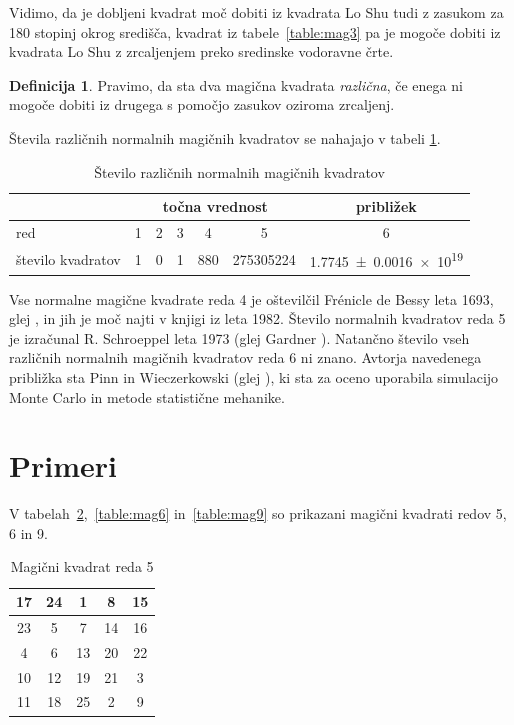 \documentclass[a4paper,12pt]{article}
\newcommand{\pojem}[1]{\emph{#1\color{purple}}}
\newenvironment{magic}[3]{\begin{table}[!ht]
   \centering
   \caption{#1}
   \label{#2}
   \large
   \begin{tabular}{|*{#3}{c|}}
   \hline}{\end{tabular}
   \normalsize
\end{table}}
\theoremstyle{definition}
\newtheorem{definicija}{Definicija}
\theoremstyle{plain}
\begin{document}
Vidimo, da je dobljeni kvadrat moč dobiti iz kvadrata Lo Shu tudi z zasukom za
180 stopinj okrog središča, kvadrat iz tabele~\ref{table:mag3} pa je mogoče dobiti
iz kvadrata Lo Shu z zrcaljenjem preko sredinske vodoravne črte. %

\begin{definicija}
   Pravimo, da sta dva magična kvadrata \pojem{različna\color{purple}}, če enega ni mogoče dobiti
   iz drugega s pomočjo zasukov oziroma zrcaljenj.
\end{definicija}

Števila različnih normalnih magičnih kvadratov se nahajajo v tabeli \ref{table:stevila}.

\begin{table}[!ht]
   \centering
   \caption{Število različnih normalnih magičnih kvadratov}
   \label{table:stevila}
   \begin{tabular}{lcccccc}\toprule
      & \multicolumn{5}{c}{točna vrednost} & približek \\
      \midrule
      red & 1 & 2 & 3 & 4 & 5 & 6 \\
      število kvadratov & 1 & 0 & 1 & 880 & \num{275305224} & \num[separate-uncertainty]{1.7745 \pm 0.0016 e19} \\
      \bottomrule
   \end{tabular}
\end{table}

Vse normalne magične kvadrate reda 4 je oštevilčil Frénicle de Bessy
leta 1693, glej \cite{bessy}, in jih je moč najti v knjigi \cite{berlekamp}
iz leta 1982. Število normalnih kvadratov reda 5 je izračunal
R. Schroeppel leta 1973 (glej Gardner \cite{gardner}).
Natančno število vseh različnih normalnih magičnih kvadratov reda 6 ni znano.
Avtorja navedenega približka sta Pinn in Wieczerkowski (glej \cite{pinn}), ki
sta za oceno uporabila simulacijo Monte Carlo in metode statistične mehanike.


\section{Primeri}

V tabelah~\ref{table:mag5},~\ref{table:mag6} in~\ref{table:mag9} so prikazani
magični kvadrati redov 5, 6 in 9. %

\begin{magic}{Magični kvadrat reda 5}{table:mag5}{5}
   17 & 24 &  1 &  8 & 15 \\\hline
   23 &  5 &  7 & 14 & 16 \\\hline
    4 &  6 & 13 & 20 & 22 \\\hline
   10 & 12 & 19 & 21 &  3 \\\hline
   11 & 18 & 25 &  2 &  9 \\\hline
\end{magic}
\end{document}
